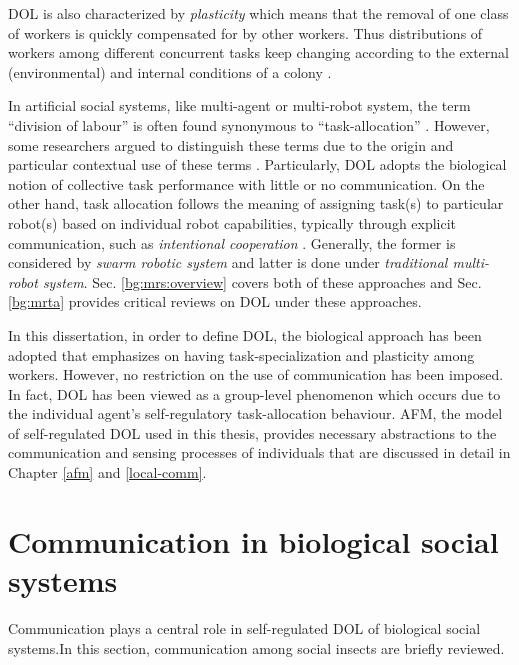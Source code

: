 DOL is also characterized by {\em plasticity} which means that the removal of one class of workers is quickly compensated for by other workers. Thus distributions of workers among different concurrent tasks keep changing according to the external (environmental) and internal conditions of a colony \cite{Garnier+2007}.

In artificial social systems, like multi-agent or multi-robot system, the term ``division of labour'' is often found synonymous to ``task-allocation'' \cite{Shen+2001}. However, some researchers  argued to distinguish these terms due to the origin and particular contextual use of these terms \cite{Labella2007}. Particularly, DOL adopts the biological notion of collective task performance with little or no communication. On the other hand, task allocation follows the meaning of assigning task(s) to particular robot(s) based on individual robot capabilities, typically through explicit communication, such as {\em intentional cooperation} \cite{Parker1998}. Generally, the former is considered by \textit{swarm robotic system} and latter is done under {\em traditional multi-robot system}. Sec. \ref{bg:mrs:overview} covers both of these approaches and Sec. \ref{bg:mrta} provides critical reviews on DOL under these approaches.

In this dissertation, in order to define DOL, the biological approach has been adopted that emphasizes on having task-specialization and plasticity among workers. However, no restriction on the use of communication has been imposed. In fact, DOL has been viewed as a group-level phenomenon which occurs due to the individual agent's self-regulatory task-allocation behaviour. AFM, the model of self-regulated DOL used in this thesis, provides necessary abstractions to the communication and sensing processes of individuals that are discussed in detail in Chapter \ref{afm} and \ref{local-comm}. 
\section{Communication in biological social systems}
\label{bg:bio-comm}
Communication plays a central role in self-regulated DOL of biological social systems.In this section, communication among  social insects are briefly reviewed.
%
